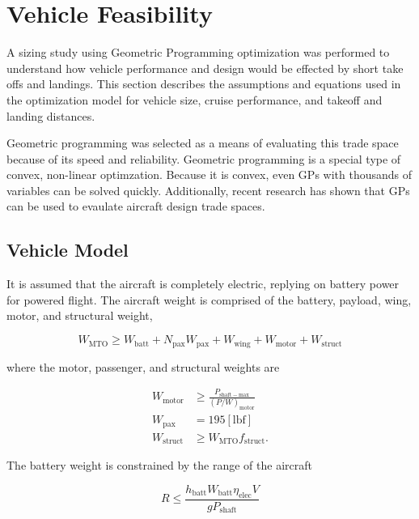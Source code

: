 \documentclass[]{aiaa-tc}%
\begin{document}
\section{Vehicle Feasibility}

A sizing study using Geometric Programming optimization was performed to understand how vehicle performance and design would be effected by short take offs and landings. 
This section describes the assumptions and equations used in the optimization model for vehicle size, cruise performance, and takeoff and landing distances.

Geometric programming was selected as a means of evaluating this trade space because of its speed and reliability.  
Geometric programming is a special type of convex, non-linear optimzation.\cite{gp}
Because it is convex, even GPs with thousands of variables can be solved quickly.\cite{gp}
Additionally, recent research has shown that GPs can be used to evaulate aircraft design trade spaces.\cite{burton_solar_2017}\cite{gpkit}


\subsection{Vehicle Model}

It is assumed that the aircraft is completely electric, replying on battery power for powered flight. 
The aircraft weight is comprised of the battery, payload, wing, motor, and structural weight,

\begin{equation}
    W_{\mathrm{MTO}} \geq W_{\mathrm{batt}} + N_{\mathrm{pax}}W_{\mathrm{pax}} + W_{\mathrm{wing}} + W_{\mathrm{motor}} + W_{\mathrm{struct}}
\end{equation}

where the motor, passenger, and structural weights are

\begin{align}
    W_{\mathrm{motor}} &\geq \frac{P_{\mathrm{shaft-max}}}{(P/W)_{\mathrm{motor}}} \\
    W_{\mathrm{pax}} &= 195 \mathrm{[lbf]} \\
    W_{\mathrm{struct}} &\geq W_{\mathrm{MTO}}f_{\mathrm{struct}}.
\end{align}

The battery weight is constrained by the range of the aircraft

\begin{equation}
    R \leq \frac{h_{\mathrm{batt}} W_{\mathrm{batt}} \eta_{\mathrm{elec}} V}{gP_{\mathrm{shaft}}}
\end{equation}
\end{document}
